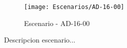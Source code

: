 \begin{figure}[H]
\centering
\texttt{[image: Escenarios/AD-16-00]}
\caption{Escenario - AD-16-00}
\label{fig:AD-16-00}
\end{figure}

Descripcion escenario...
\clearpage
